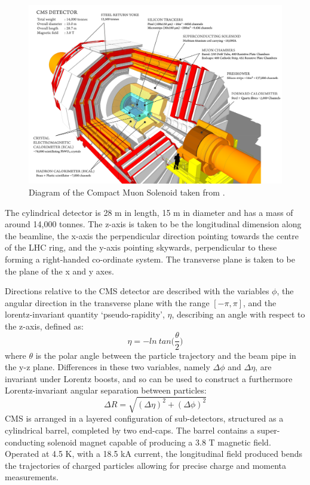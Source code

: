 \begin{figure}
  \centering
  \includegraphics[width=\textwidth]{Figs/machine/cms_120918_02.png}
  \caption{Diagram of the Compact Muon Solenoid taken from
  \cite{Sakuma:2013jqa}.}
  \label{fig:cms_diagram}
\end{figure}

The cylindrical detector is 28 m in length, 15 m in diameter and has a mass of 
around 14,000 tonnes. 
The z-axis is taken to be the longitudinal dimension along the beamline, the
x-axis the perpendicular direction pointing towards the centre of the LHC ring, 
and the y-axis pointing skywards, perpendicular to these forming a right-handed 
co-ordinate system. The transverse plane is taken to be the plane of the x and y
axes.

Directions relative to the CMS detector are described with the variables $\phi$,
the angular direction in the transverse plane with the range $[-\pi, \pi]$, and 
the lorentz-invariant quantity `pseudo-rapidity', $\eta$, describing an angle
with respect to the z-axis, defined as:
% 
\begin{equation}
\eta = - ln \ tan \Bigg( \frac{\theta}{2} \Bigg)
\end{equation}
% 
where $\theta$ is the polar angle between the particle trajectory and the beam
pipe in the y-z plane.
Differences in these two variables, namely $\Delta \phi$ and $\Delta 
\eta$, are invariant under Lorentz boosts, and so can be used to construct a 
furthermore Lorentz-invariant angular separation between particles:
% 
\begin{equation}
\Delta R = \sqrt{ (\Delta \eta)^2 + (\Delta \phi)^2}
\end{equation}
% 
CMS is arranged in a layered configuration of sub-detectors, structured as a 
cylindrical barrel, completed by two end-caps. The barrel contains a
super-conducting solenoid magnet capable of producing a 3.8 T magnetic field. 
Operated at 4.5 K, with a 18.5 kA current, the longitudinal field produced bends
the trajectories of charged particles allowing for precise charge and momenta 
measurements.

